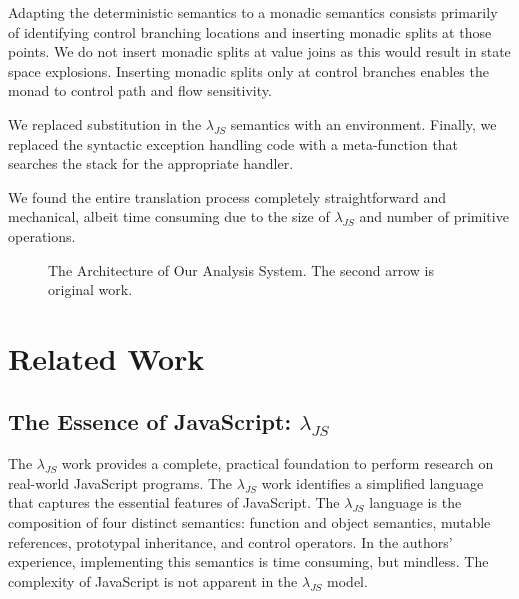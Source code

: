 \documentclass[10pt,letter,english]{article}
\newcommand{\maam}[0]{\textsc{maam}}
\newcommand{\js}[0]{JavaScript}
\newcommand{\lambdajs}[0]{$\lambda_{JS}$}
\begin{document}
Adapting the deterministic semantics to a monadic semantics consists primarily
of identifying control branching locations and inserting monadic splits at those
points. We do not insert monadic splits at value joins as this would result in
state space explosions. Inserting monadic splits only at control branches
enables the monad to control path and flow sensitivity.

We replaced substitution in the \lambdajs{} semantics with an
environment. Finally, we replaced the syntactic exception handling code with a
meta-function that searches the stack for the appropriate handler.

We found the entire translation process completely straightforward and
mechanical, albeit time consuming due to the size of \lambdajs{} and number of
primitive operations.

\begin{figure}
\centering

\caption{The Architecture of Our Analysis System. The second arrow is original work.}
\end{figure}

\section{Related Work}
\subsection{The Essence of JavaScript: \lambdajs{}}

The \lambdajs{} work provides a complete, practical foundation to perform
research on real-world JavaScript programs. The \lambdajs{} work identifies a
simplified language that captures the essential features of \js{}. The
\lambdajs{} language is the composition of four distinct semantics: function and
object semantics, mutable references, prototypal inheritance, and control
operators. In the authors' experience, implementing this semantics is time
consuming, but mindless. The complexity of \js{} is not apparent in the
\lambdajs{} model.
\end{document}
